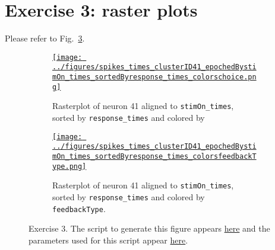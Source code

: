 \documentclass[12pt]{article}
\def\fig_width{3.5in}
\begin{document}
\section*{Exercise 3: raster plots}

Please refer to Fig.~\ref{fig:ex3}.

\begin{figure}[H]
    \begin{center}

        \begin{subfigure}{1.0\textwidth}
            \centering
            \href{https://www.gatsby.ucl.ac.uk/~rapela/neuroinformatics/2023/ws1/figures/spikes_times_clusterID41_epochedBystimOn_times_sortedByresponse_times_colorschoice.html}{\texttt{[image: ../figures/spikes\_times\_clusterID41\_epochedBystimOn\_times\_sortedByresponse\_times\_colorschoice.png]}}

            \caption{Rasterplot of neuron 41 aligned to
            \texttt{stimOn\_times},
            sorted by
            \texttt{response\_times}
            and colored by
            }

            \label{fig:ex3_1}
        \end{subfigure}

        \begin{subfigure}{1.0\textwidth}
            \centering
            \href{https://www.gatsby.ucl.ac.uk/~rapela/neuroinformatics/2023/ws1/figures/spikes_times_clusterID41_epochedBystimOn_times_sortedByresponse_times_colorsfeedbackType.html}{\texttt{[image: ../figures/spikes\_times\_clusterID41\_epochedBystimOn\_times\_sortedByresponse\_times\_colorsfeedbackType.png]}}

            \caption{Rasterplot of neuron 41 aligned to
            \texttt{stimOn\_times},
            sorted by
            \texttt{response\_times}
            and colored by
            \texttt{feedbackType}.
            }

            \label{fig:ex3_2}
        \end{subfigure}

        \caption{Exercise 3. The script to generate this figure appears
        \href{https://github.com/joacorapela/neuroinformatics23/blob/master/worksheets/ws1/mySolution/code/scripts/doPlotEpochedSpikesTimes.py}{here}
        and the parameters used for this script appear
        \href{https://github.com/joacorapela/neuroinformatics23/blob/master/worksheets/ws1/mySolution/code/scripts/doPlotEpochedSpikesTimes.csh}{here}.
        }

        \label{fig:ex3}


    \end{center}
\end{figure}
\end{document}

